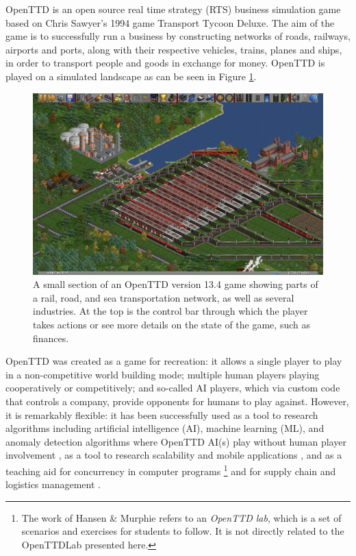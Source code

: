 \documentclass[logo,msc,dsti]{style/infthesis}    %
\newcommand{\singlespacedfootnote}[1]{{\singlespace\footnote{#1}}}
\begin{document}
OpenTTD \cite{openttd} is an open source real time strategy (RTS) business simulation game based on  Chris Sawyer's 1994 game Transport Tycoon Deluxe. The aim of the game is to successfully run a business by constructing networks of roads, railways, airports and ports, along with their respective vehicles, trains, planes and ships, in order to transport people and goods in exchange for money. OpenTTD is played on a simulated landscape as can be seen in Figure \ref{figure:introduction-screenshot}.

\begin{figure}[ht]
\centering
\includegraphics[width=\columnwidth]{assets/openttd_screenshot.png}
\caption{A small section of an OpenTTD version 13.4 game showing parts of a rail, road, and sea transportation network, as well as several industries. At the top is the control bar through which the player takes actions or see more details on the state of the game, such as finances.}
\label{figure:introduction-screenshot}
\end{figure}

OpenTTD was created as a game for recreation: it allows a single player to play in a non-competitive world building mode; multiple human players playing cooperatively or competitively; and so-called AI players, which via custom code that controls a company, provide opponents for humans to play against. However, it is remarkably flexible: it has been successfully used as a tool to research algorithms including artificial intelligence (AI), machine learning (ML), and anomaly detection algorithms where OpenTTD AI(s) play without human player involvement \cite{beuneker2019autonomous, bijlsma2014evolving, konijnendijk2015mcts, lakomy2020railroad, rios2009trains, wisniewski2011artificial, volna2017fuzzy}, as a tool to research scalability and mobile applications \cite{jiang2018mirroring}, and as a teaching aid for concurrency in computer programs \cite{HansenMuprhie2018, marmorstein2015teaching}\singlespacedfootnote{The work of Hansen \& Murphie \cite{HansenMuprhie2018} refers to an \emph{OpenTTD lab}, which is a set of scenarios and exercises for students to follow. It is not directly related to the OpenTTDLab presented here.} and for supply chain and logistics management \cite{doi:10.1080/10494820.2016.1242503}.
\end{document}
